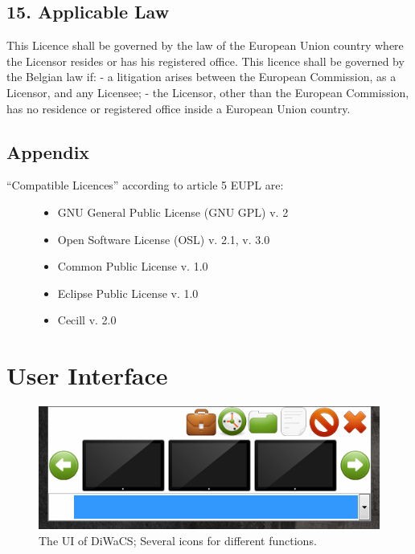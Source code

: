 \documentclass[letterpaper,10pt,english]{sphinxmanual}
\begin{document}
\section{15. Applicable Law}
\label{license:applicable-law}
This Licence shall be governed by the law of the European Union country where the
Licensor resides or has his registered office.
This licence shall be governed by the Belgian law if:
- a litigation arises between the European Commission, as a Licensor, and any Licensee;
- the Licensor, other than the European Commission, has no residence or registered office inside a European Union country.


\section{Appendix}
\label{license:appendix}\begin{description}
\item[{“Compatible Licences” according to article 5 EUPL are:}] \leavevmode\begin{itemize}
\item {} 
GNU General Public License (GNU GPL) v. 2

\item {} 
Open Software License (OSL) v. 2.1, v. 3.0

\item {} 
Common Public License v. 1.0

\item {} 
Eclipse Public License v. 1.0

\item {} 
Cecill v. 2.0

\end{itemize}

\end{description}


\chapter{User Interface}
\label{ui::doc}\label{ui:user-interface}\begin{figure}[htbp]
\centering
\capstart

\includegraphics{screencap.png}
\caption{The UI of DiWaCS; Several icons for different functions.}\end{figure}
\end{document}
